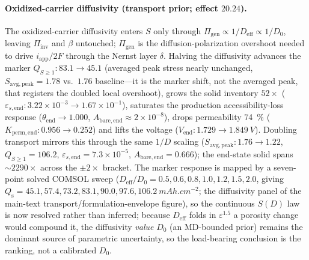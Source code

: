 \documentclass[11pt]{article}
\newcommand{\epsl}{\varepsilon}
\newcommand{\Deff}{D_{\mathrm{eff}}}
\newcommand{\mAhcm}{\si{mAh.cm^{-2}}}
\begin{document}
\paragraph{Oxidized-carrier diffusivity (transport prior; effect $20.24$).} The oxidized-carrier diffusivity enters $S$
only through $\Pi_{\mathrm{gen}}\propto1/\Deff\propto1/D_0$, leaving $\Pi_{\mathrm{inv}}$ and $\beta$ untouched;
$\Pi_{\mathrm{gen}}$ is the diffusion-polarization overshoot needed to drive $i_{\mathrm{app}}/2F$ through the
Nernst layer $\delta$. Halving the diffusivity advances the marker $Q_{S\ge1}:83.1\to45.1$ (averaged peak
stress nearly unchanged, $S_{\mathrm{avg,peak}}=1.78$ vs.\ $1.76$ baseline---it is the marker shift, not the
averaged peak, that registers the doubled local overshoot), grows the solid inventory $52\times$
($\varepsilon_{s,\mathrm{end}}:3.22\times10^{-3}\to1.67\times10^{-1}$), saturates the production
accessibility-loss response
($\theta_{\mathrm{end}}\to1.000$, $A_{\mathrm{bare,end}}\approx2\times10^{-8}$), drops permeability
\SI{74}{\percent} ($K_{\mathrm{perm,end}}:0.956\to0.252$) and lifts the voltage
($V_{\mathrm{end}}:1.729\to\SI{1.849}{V}$). Doubling transport mirrors this through the same $1/D$ scaling
($S_{\mathrm{avg,peak}}:1.76\to1.22$, $Q_{S\ge1}=106.2$, $\varepsilon_{s,\mathrm{end}}=7.3\times10^{-5}$,
$A_{\mathrm{bare,end}}=0.666$); the end-state solid spans $\sim\!2290\times$ across the $\pm2\times$ bracket.
The marker response is mapped by a seven-point solved COMSOL sweep ($\Deff/D_0=0.5,0.6,0.8,1.0,1.2,1.5,2.0$,
giving $Q_{\mathrm s}=45.1,57.4,73.2,83.1,90.0,97.6,\SI{106.2}{\mAhcm}$; the diffusivity panel of the
main-text transport/formulation-envelope figure), so the continuous
$S(D)$ law is now resolved rather than inferred; because $\Deff$ folds in $\epsl^{1.5}$ a porosity change
would compound it, the diffusivity \emph{value} $D_0$ (an MD-bounded prior) remains the dominant source of
parametric uncertainty, so the load-bearing conclusion is the ranking, not a calibrated $D_0$.
\end{document}
